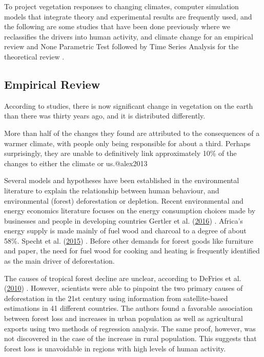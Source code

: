 \documentclass[12pt,a4paper]{book}
\begin{document}
{To project vegetation responses to changing climates, computer
simulation models that integrate theory and experimental results are
frequently used, and the following are some studies that have been done
previously where we reclassifies the drivers into human activity, and
climate change for an empirical review and None Parametric Test followed
by Time Series Analysis for the theoretical review .

\hypertarget{empirical-review}{%
\subsection{Empirical Review}\label{empirical-review}}

According to studies, there is now significant change in vegetation on
the earth than there was thirty years ago, and it is distributed
differently.

More than half of the changes they found are attributed to the
consequences of a warmer climate, with people only being responsible for
about a third. Perhaps surprisingly, they are unable to definitively
link approximately 10\% of the changes to either the climate or
us.@alex2013

Several models and hypotheses have been established in the environmental
literature to explain the relationship between human behaviour, and
environmental (forest) deforestation or depletion. Recent environmental
and energy economics literature focuses on the energy consumption
choices made by businesses and people in developing countries Gertler et
al. (\protect\hyperlink{ref-gertler2016}{2016}) . Africa's energy supply
is made mainly of fuel wood and charcoal to a degree of about 58\%.
Specht et al. (\protect\hyperlink{ref-specht2015}{2015}) . Before other
demands for forest goods like furniture and paper, the need for fuel
wood for cooking and heating is frequently identified as the main driver
of deforestation.

The causes of tropical forest decline are unclear, according to DeFries
et al. (\protect\hyperlink{ref-defries2010}{2010}) . However, scientists
were able to pinpoint the two primary causes of deforestation in the
21st century using information from satellite-based estimations in 41
different countries. The authors found a favorable association between
forest loss and increases in urban population as well as agricultural
exports using two methods of regression analysis. The same proof,
however, was not discovered in the case of the increase in rural
population. This suggests that forest loss is unavoidable in regions
with high levels of human activity.

}
\end{document}
